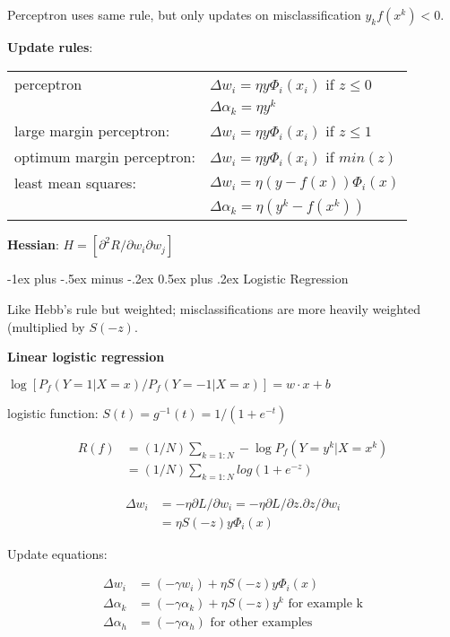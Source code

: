 \documentclass[10pt,landscape]{article}
\makeatletter
\renewcommand{\section}{\@startsection{section}{1}{0mm}%
                                {-1ex plus -.5ex minus -.2ex}%
                                {0.5ex plus .2ex}%
                                {\normalfont\large\bfseries}}
\makeatother
\begin{document}
\begin{multicols}{3}
Perceptron uses same rule, but only updates on misclassification $y_k f(x^k) < 0$.

\textbf{Update rules}:

\begin{tabular}{@{}ll@{}}
perceptron                  & $\Delta w_i = \eta y \Phi_i(x_i)$ if $z \le 0$ \\
                            & $\Delta \alpha_k = \eta y^k$ \\
large margin perceptron:    & $\Delta w_i = \eta y \Phi_i(x_i)$ if $z \le 1$ \\
optimum margin perceptron:  & $\Delta w_i = \eta y \Phi_i(x_i)$ if $min(z)$ \\
least mean squares:         & $\Delta w_i = \eta (y - f(x)) \Phi_i (x)$ \\
                            & $\Delta \alpha_k = \eta (y^k - f(x^k))$
\end{tabular}

\textbf{Hessian}: $H = [\partial^2 R / \partial w_i \partial w_j]$


\section{Logistic Regression}

Like Hebb's rule but weighted; misclassifications are more heavily weighted (multiplied by $S(-z)$.

\textbf{Linear logistic regression}

$\log [P_f (Y=1 | X=x) / P_f (Y=-1 | X=x)] = w \cdot x + b$

logistic function: $S(t) = g^{-1}(t) = 1 / (1+e^{-t})$

\begin{align*}
R(f) &= (1/N) \sum_{k=1:N} -\log P_f (Y=y^k | X=x^k) \\
&= (1/N) \sum_{k=1:N} log(1+e^{-z})
\end{align*}

\begin{align*}
\Delta w_i &= -\eta \partial L  / \partial w_i = -\eta \partial L / \partial z . \partial z / \partial w_i \\
&= \eta S(-z) y \Phi_i (x)
\end{align*}

Update equations:

\begin{align*}
\Delta w_i &= (-\gamma w_i) + \eta S(-z) y \Phi_i (x) \\
\Delta \alpha_k &= (-\gamma \alpha_k) + \eta S(-z) y^k \text{ for example k} \\
\Delta \alpha_h &= (-\gamma \alpha_h) \text{ for other examples}
\end{align*}



\end{multicols}
\end{document}

